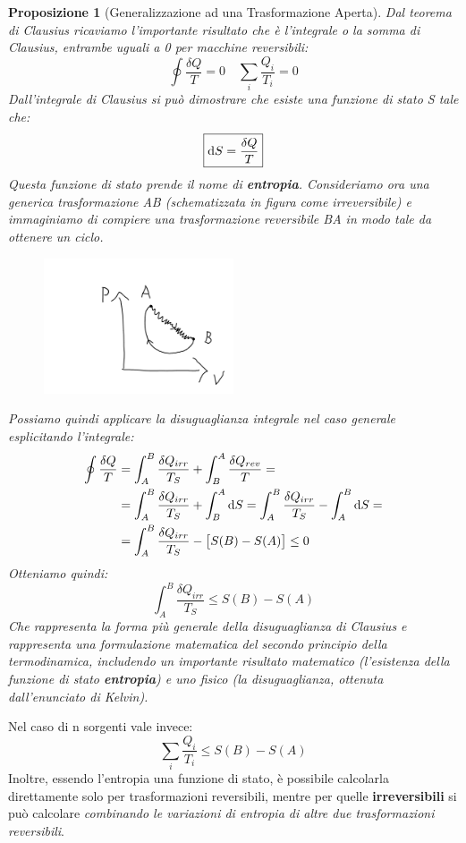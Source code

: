 \documentclass{article}
\newtheorem{prop}[defn]{Proposizione}
\newcommand{\note}{\noindent {\quad \bf \underline{Osservazione:}} \quad}
\begin{document}
\begin{prop}[Generalizzazione ad una Trasformazione Aperta]
Dal teorema di Clausius ricaviamo l'importante risultato che è l'integrale o la somma di Clausius, entrambe uguali a 0 per macchine reversibili:
\[\oint\frac{\delta Q}{T}=0\quad\sum_i\frac{Q_i}{T_i}=0\]
Dall'integrale di Clausius si può dimostrare che esiste una funzione di stato S tale che:
\begin{equation}
\boxed{\dif S=\frac{\delta Q}{T}}
\end{equation}
Questa funzione di stato prende il nome di \textbf{entropia}.
Consideriamo ora una generica trasformazione AB (schematizzata in figura come irreversibile) e immaginiamo di compiere una trasformazione reversibile BA in modo tale da ottenere un ciclo. 
\begin{figure}[H]
    \centering
    \includegraphics[width=0.5\textwidth]{TrasfAperta.png}
    \label{TrasformazioneAperta}
\end{figure}
Possiamo quindi applicare la disuguaglianza integrale nel caso generale esplicitando l'integrale:
\begin{equation}
\begin{split}
    \oint\frac{\delta Q}{T}&=\int_A^B\frac{\delta Q_{irr}}{T_S}+\int_B^A\frac{\delta Q_{rev}}{T}=\\
    &=\int_A^B\frac{\delta Q_{irr}}{T_S}+\int_B^A\dif S=\int_A^B\frac{\delta Q_{irr}}{T_S}-\int_A^B\dif S=\\
    &=\int_A^B\frac{\delta Q_{irr}}{T_S}-\left[S(B)-S(A)\right]\leq 0
\end{split}
\end{equation}
Otteniamo quindi:
\[\boxed{\int_A^B\frac{\delta Q_{irr}}{T_S}\leq S(B)-S(A)}\]
Che rappresenta la forma più generale della disuguaglianza di Clausius e rappresenta una formulazione matematica del secondo principio della termodinamica, includendo un importante risultato matematico (l'esistenza della funzione di stato \textbf{entropia}) e uno fisico (la disuguaglianza, ottenuta dall'enunciato di Kelvin).
\end{prop}
\note Nel caso di n sorgenti vale invece:
\[\sum_i\frac{Q_i}{T_i}\leq S(B)-S(A)\]
Inoltre, essendo l'entropia una funzione di stato, è possibile calcolarla direttamente solo per trasformazioni reversibili, mentre per quelle \textbf{irreversibili} si può calcolare \textit{combinando le variazioni di entropia di altre due trasformazioni reversibili}.
\end{document}
